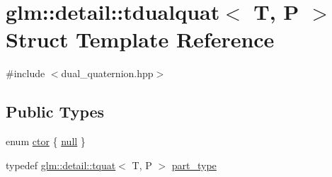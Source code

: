 \hypertarget{structglm_1_1detail_1_1tdualquat}{}\section{glm\+:\+:detail\+:\+:tdualquat$<$ T, P $>$ Struct Template Reference}
\label{structglm_1_1detail_1_1tdualquat}


{\ttfamily \#include $<$dual\+\_\+quaternion.\+hpp$>$}

\subsection*{Public Types}
\begin{DoxyCompactItemize}
\item 
enum \hyperlink{structglm_1_1detail_1_1tdualquat_ace336aab392c50d450452edacc3d7f41}{ctor} \{ \hyperlink{structglm_1_1detail_1_1tdualquat_ace336aab392c50d450452edacc3d7f41a9649d51893e82ea43ff08e3c5f06bdc9}{null}
 \}
\item 
typedef \hyperlink{structglm_1_1detail_1_1tquat}{glm\+::detail\+::tquat}$<$ T, P $>$ \hyperlink{structglm_1_1detail_1_1tdualquat_a811e451c41fec5277ac7c99381152df4}{part\+\_\+type}
\end{DoxyCompactItemize}
